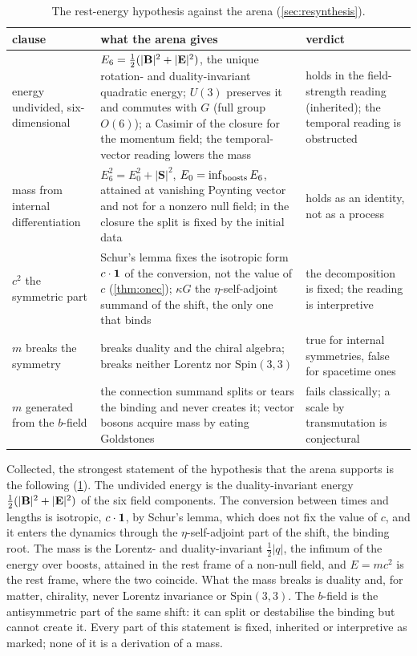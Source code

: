 \begin{table}[t]
\centering
\small
\begin{tabular}{@{}>{\raggedright\arraybackslash}p{3.4cm}>{\raggedright\arraybackslash}p{6.7cm}>{\raggedright\arraybackslash}p{4.2cm}@{}}
\toprule
clause & what the arena gives & verdict\\
\midrule
energy undivided, six-dimensional & $E_6=\tfrac12(|\mathbf B|^2+|\mathbf E|^2)$, the unique rotation- and duality-invariant quadratic energy; $U(3)$ preserves it and commutes with $G$ (full group $O(6)$); a Casimir of the closure for the momentum field; the temporal-vector reading lowers the mass & holds in the field-strength reading (inherited); the temporal reading is obstructed\\
mass from internal differentiation & $E_6^2=E_0^2+|\mathbf S|^2$, $E_0=\inf_{\rm boosts}E_6$, attained at vanishing Poynting vector and not for a nonzero null field; in the closure the split is fixed by the initial data & holds as an identity, not as a process\\
$c^2$ the symmetric part & Schur's lemma fixes the isotropic form $c\cdot\mathbf 1$ of the conversion, not the value of $c$ (\cref{thm:onec}); $\kappa G$ the $\eta$-self-adjoint summand of the shift, the only one that binds & the decomposition is fixed; the reading is interpretive\\
$m$ breaks the symmetry & breaks duality and the chiral algebra; breaks neither Lorentz nor $\mathrm{Spin}(3,3)$ & true for internal symmetries, false for spacetime ones\\
$m$ generated from the $b$-field & the connection summand splits or tears the binding and never creates it; vector bosons acquire mass by eating Goldstones & fails classically; a scale by transmutation is conjectural\\
\bottomrule
\end{tabular}
\caption{The rest-energy hypothesis against the arena (\cref{sec:resynthesis}).}
\label{tab:resynthesis}
\end{table}

Collected, the strongest statement of the hypothesis that the arena supports is the following (\cref{tab:resynthesis}). The undivided energy is
the duality-invariant energy $\tfrac12(|\mathbf B|^2+|\mathbf E|^2)$ of the six field components. The conversion between times and lengths is isotropic,
$c\cdot\mathbf 1$, by Schur's lemma, which does not fix the value of $c$, and it enters the dynamics through the $\eta$-self-adjoint part of the shift, the binding root. The mass is the
Lorentz- and duality-invariant $\tfrac12|q|$, the infimum of the energy over boosts, attained in the rest frame of a non-null field, and $E=mc^2$ is
the rest frame, where the two coincide.
What the mass breaks is duality and, for matter, chirality, never Lorentz invariance or $\mathrm{Spin}(3,3)$. The $b$-field is the
antisymmetric part of the same shift: it can split or destabilise the binding but cannot create it. Every part of this statement is fixed,
inherited or interpretive as marked; none of it is a derivation of a mass.

